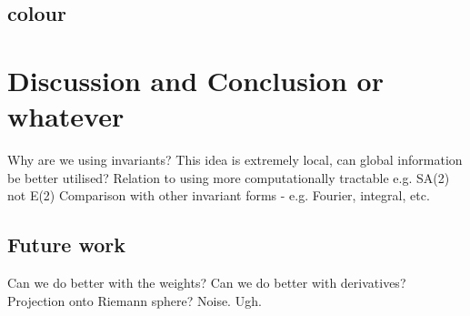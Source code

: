 \documentclass{article}
\begin{document}
\subsection{colour}

\section{Discussion and Conclusion or whatever}
Why are we using invariants? 
This idea is extremely local, can global information be better utilised?
Relation to using more computationally
tractable e.g. SA(2) not E(2)
Comparison with other invariant forms - e.g. Fourier, integral, etc.

\subsection{Future work}
Can we do better with the weights?
Can we do better with derivatives?
Projection onto Riemann sphere?
Noise. Ugh.
\end{document}
